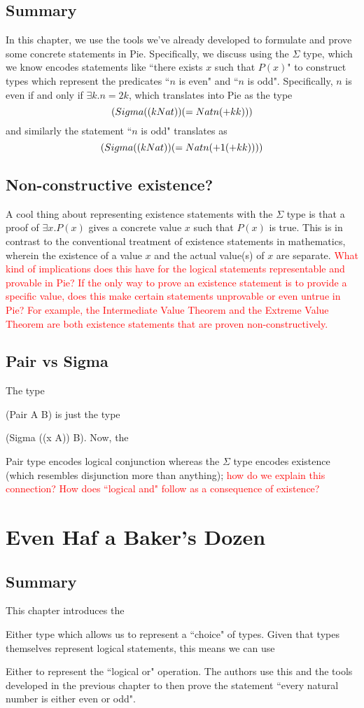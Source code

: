 \documentclass{article}
\newcommand*{\SavedLstInline}{}
\DeclareRobustCommand*{\lstinline}{%
  \ifmmode
    \let\SavedBGroup\bgroup
    \def\bgroup{%
      \let\bgroup\SavedBGroup
      \hbox\bgroup
    }%
  \fi
  \SavedLstInline
}
\begin{document}
\subsection{Summary}
In this chapter, we use the tools we've already developed to formulate and prove some concrete statements in Pie. Specifically, we discuss using the \(\Sigma\) type, which we know encodes statements like ``there exists \(x\) such that \(P(x)\)" to construct types which represent the predicates ``\(n\) is even" and ``\(n\) is odd". Specifically, \(n\) is even if and only if \(\exists k. n = 2k\), which translates into Pie as the type \[
    \lstinline{(Sigma ((k Nat)) (= Nat n (+ k k)))}
\] and similarly the statement ``\(n\) is odd" translates as \[
    \lstinline{(Sigma ((k Nat)) (= Nat n (+ 1 (+ k k))))}
\]
\subsection{Non-constructive existence?}
A cool thing about representing existence statements with the \(\Sigma\) type is that a proof of \(\exists x. P(x)\) gives a concrete value \(x\) such that \(P(x)\) is true. This is in contrast to the conventional treatment of existence statements in mathematics, wherein the existence of a value \(x\) and the actual value(s) of \(x\) are separate. \textcolor{red}{What kind of implications does this have for the logical statements representable and provable in Pie? If the only way to prove an existence statement is to provide a specific value, does this make certain statements unprovable or even untrue in Pie? For example, the Intermediate Value Theorem and the Extreme Value Theorem are both existence statements that are proven non-constructively.}
\subsection{Pair vs Sigma}
The type \lstinline{(Pair A B)} is just the type \lstinline{(Sigma ((x A)) B)}. Now, the \lstinline{Pair} type encodes logical conjunction whereas the \(\Sigma\) type encodes existence (which resembles disjunction more than anything); \textcolor{red}{how do we explain this connection? How does ``logical and" follow as a consequence of existence?}
\section{Even Haf a Baker's Dozen}
\subsection{Summary}
This chapter introduces the \lstinline{Either} type which allows us to represent a ``choice" of types. Given that types themselves represent logical statements, this means we can use \lstinline{Either} to represent the ``logical or" operation. The authors use this and the tools developed in the previous chapter to then prove the statement ``every natural number is either even or odd".
\end{document}
